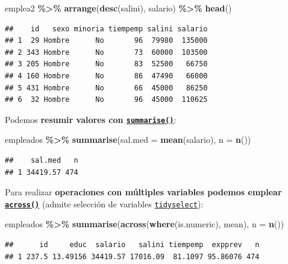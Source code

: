 \documentclass[
]{book}
\newenvironment{Shaded}{\begin{snugshade}}{\end{snugshade}}
\newcommand{\AttributeTok}[1]{\textcolor[rgb]{0.13,0.29,0.53}{#1}}
\newcommand{\FunctionTok}[1]{\textcolor[rgb]{0.13,0.29,0.53}{\textbf{#1}}}
\newcommand{\NormalTok}[1]{#1}
\newcommand{\SpecialCharTok}[1]{\textcolor[rgb]{0.81,0.36,0.00}{\textbf{#1}}}
\begin{document}
\begin{Shaded}
\begin{Highlighting}[]
\NormalTok{emplea2 }\SpecialCharTok{\%\textgreater{}\%} \FunctionTok{arrange}\NormalTok{(}\FunctionTok{desc}\NormalTok{(salini), salario) }\SpecialCharTok{\%\textgreater{}\%} \FunctionTok{head}\NormalTok{()}
\end{Highlighting}
\end{Shaded}

\begin{verbatim}
##    id   sexo minoria tiempemp salini salario
## 1  29 Hombre      No       96  79980  135000
## 2 343 Hombre      No       73  60000  103500
## 3 205 Hombre      No       83  52500   66750
## 4 160 Hombre      No       86  47490   66000
## 5 431 Hombre      No       66  45000   86250
## 6  32 Hombre      No       96  45000  110625
\end{verbatim}

Podemos \textbf{resumir valores con \href{https://dplyr.tidyverse.org/reference/summarise.html}{\texttt{summarise()}}}:

\begin{Shaded}
\begin{Highlighting}[]
\NormalTok{empleados }\SpecialCharTok{\%\textgreater{}\%} \FunctionTok{summarise}\NormalTok{(}\AttributeTok{sal.med =} \FunctionTok{mean}\NormalTok{(salario), }\AttributeTok{n =} \FunctionTok{n}\NormalTok{())}
\end{Highlighting}
\end{Shaded}

\begin{verbatim}
##    sal.med   n
## 1 34419.57 474
\end{verbatim}

Para realizar \textbf{operaciones con múltiples variables podemos emplear \href{https://dplyr.tidyverse.org/reference/across.html}{\texttt{across()}}} (admite selección de variables \href{https://tidyselect.r-lib.org}{\texttt{tidyselect}}):

\begin{Shaded}
\begin{Highlighting}[]
\NormalTok{empleados }\SpecialCharTok{\%\textgreater{}\%} \FunctionTok{summarise}\NormalTok{(}\FunctionTok{across}\NormalTok{(}\FunctionTok{where}\NormalTok{(is.numeric), mean), }\AttributeTok{n =} \FunctionTok{n}\NormalTok{())}
\end{Highlighting}
\end{Shaded}

\begin{verbatim}
##      id     educ  salario   salini tiempemp  expprev   n
## 1 237.5 13.49156 34419.57 17016.09  81.1097 95.86076 474
\end{verbatim}
\end{document}

